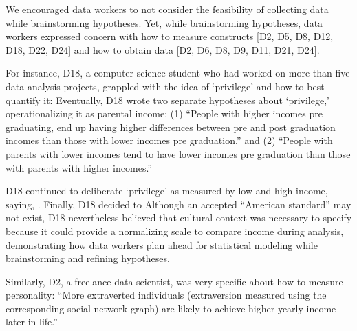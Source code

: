 
We encouraged data workers to not consider the feasibility of collecting data
while brainstorming hypotheses. Yet, while brainstorming hypotheses,
data workers expressed concern with how to measure constructs [D2, D5, D8,
D12, D18, D22, D24] and how to obtain data [D2, D6, D8, D9, D11, D21, D24].

For instance, D18, a computer science student who had worked on more than five data
analysis projects, grappled with the idea of `privilege' and how to best
quantify it:  Eventually, D18 wrote two
separate hypotheses about `privilege,' operationalizing it as parental income:
(1) ``People with higher incomes pre graduating, end up having higher
differences between pre and post graduation incomes than those with lower
incomes pre graduation.'' and (2) ``People with parents with lower incomes tend
to have lower incomes pre graduation than those with parents with higher
incomes.'' 

D18 continued to deliberate `privilege' as measured by low and high income,
saying, . Finally, D18 decided to
Although an accepted ``American standard'' may not exist, D18 nevertheless
believed that cultural context was necessary to specify because it could provide
a normalizing scale to compare income during analysis, demonstrating how
data workers plan ahead for statistical modeling while brainstorming and refining
hypotheses. 

Similarly, D2, a freelance data scientist, was very specific about how to measure personality:
``More extraverted individuals (extraversion measured using
the corresponding social network graph) are likely to
achieve higher yearly income later in life.'' 

